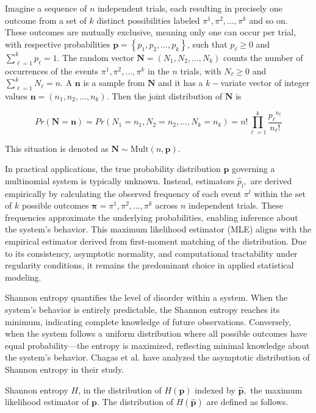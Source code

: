 Imagine a sequence of $n$ independent trials, each resulting in precisely one outcome from a set of $k$ distinct possibilities labeled $\pi^1,\pi^2, \dots, \pi^k$ and so on. These outcomes are mutually exclusive, meaning only one can occur per trial, with respective probabilities $\bm{p}={\left\{p_1,p_2,\dots,p_k\right\}}$, such that $p_\ell \geq 0$ and $\sum^{k}_{\ell=1} {p_\ell =1}.$ The random vector $\bm{N}=(N_1,N_2,\dots, N_k)$ counts the number of occurrences of the events $\pi^1,\pi^2, \dots, \pi^k$ in the $n$ trials, with $N_\ell \geq0$ and $\sum^{k}_{\ell=1} {N_\ell =n}.$ A $\bm{n}$ is a sample from $\bm{N}$ and it has a $k-$variate vector of integer values $\bm{n}=(n_1,n_2,\dots,n_k).$ Then the joint distribution of $\bm{N}$ is 

\begin{equation}
	Pr(\bm{N=n})=Pr(N_1=n_1,N_2=n_2, \dots,N_k=n_k)=n!\prod_{\ell=1}^{k}\frac{{p_\ell}^{n_\ell}}{n_\ell !}
\end{equation}   

This situation is denoted as $\bm{N}\sim \text{Mult}(n,\bm{p}).$ \cite{Rey2023}
   
      
In practical applications, the true probability distribution $\bm{p}$ governing a multinomial system is typically unknown. Instead, estimators $\widehat{p}_l,$ are derived empirically by calculating the observed frequency of each event $\pi^l$ within the set of $k$ possible outcomes $\bm{\pi}=\pi^1,\pi^2, \dots, \pi^k$  across $n$ independent trials. These frequencies approximate the underlying probabilities, enabling inference about the system’s behavior. This maximum likelihood estimator (MLE) aligns with the empirical estimator derived from first-moment matching of the distribution. Due to its consistency, asymptotic normality, and computational tractability under regularity conditions, it remains the predominant choice in applied statistical modeling.

Shannon entropy quantifies the level of disorder within a system. When the system's behavior is entirely predictable, the Shannon entropy reaches its minimum, indicating complete knowledge of future observations. Conversely, when the system follows a uniform distribution where all possible outcomes have equal probability—the entropy is maximized, reflecting minimal knowledge about the system's behavior. Chagas et al. \cite{Chagas2022} have analyzed the asymptotic distribution of Shannon entropy in their study. 

Shannon entropy $H$, in the distribution of $H(\bm{p})$ indexed by $\widehat{\bm{p}},$ the maximum likelihood estimator of $\bm{p}$. The distribution of $H(\widehat{\bm{p}})$ are defined as follows. 

